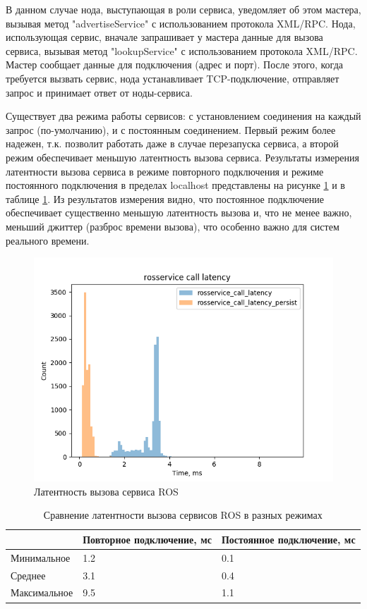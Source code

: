 В данном случае нода, выступающая в роли сервиса, уведомляет об этом мастера, вызывая метод "advertiseService" с
использованием протокола XML/RPC. Нода, использующая сервис, вначале запрашивает у мастера данные для вызова сервиса,
вызывая метод "lookupService" с использованием протокола XML/RPC. Мастер сообщает данные  для подключения (адрес и порт).
После этого, когда требуется вызвать сервис, нода устанавливает TCP-подключение, отправляет запрос и принимает ответ
от ноды-сервиса.

Существует два режима работы сервисов: с установлением соединения на каждый запрос (по-умолчанию), и с постоянным
соединением. Первый режим более надежен, т.к. позволит работать даже в случае перезапуска сервиса, а второй режим
обеспечивает меньшую латентность вызова сервиса. Результаты измерения латентности вызова сервиса в режиме повторного
подключения и режиме постоянного подключения в пределах localhost представлены на рисунке
\ref{img:rosservice_call_latency} и в таблице \ref{tab:rosservice_call_latency}. Из результатов измерения видно,
что постоянное подключение обеспечивает существенно меньшую латентность вызова и, что не менее важно, меньший
джиттер (разброс времени вызова), что особенно важно для систем реального времени.

\begin{figure}[h]
    \centering
    \includegraphics[]{images/3_devel/rosservice_call_latency}
    \caption{Латентность вызова сервиса ROS}
    \label{img:rosservice_call_latency}
\end{figure}

\begin{table}[h]
    \caption{Сравнение латентности вызова сервисов ROS в разных режимах}
    \label{tab:rosservice_call_latency}
    \begin{tabularx}{\textwidth}{|l|X|X|}
        \hline
                     & Повторное подключение, мс & Постоянное подключение, мс \\
        \hline
        Минимальное  & 1.2 & 0.1 \\
        \hline
        Среднее      & 3.1 & 0.4 \\
        \hline
        Максимальное & 9.5 & 1.1 \\
        \hline
    \end{tabularx}
\end{table}

